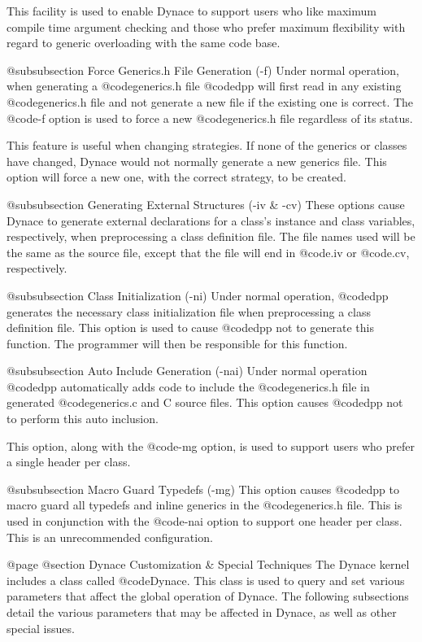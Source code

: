 This facility is used to enable Dynace to support users who like
maximum compile time argument checking and those who prefer maximum
flexibility with regard to generic overloading with the same code
base.

@subsubsection Force Generics.h File Generation (-f)
Under normal operation, when generating a @code{generics.h} file
@code{dpp} will first read in any existing @code{generics.h} file
and not generate a new file if the existing one is correct.  The
@code{-f} option is used to force a new @code{generics.h} file
regardless of its status.

This feature is useful when changing strategies.  If none of the generics
or classes have changed, Dynace would not normally generate a new generics
file.  This option will force a new one, with the correct strategy, to
be created.

@subsubsection Generating External Structures (-iv & -cv)
These options cause Dynace to generate external declarations for
a class's instance and class variables, respectively, when preprocessing
a class definition file.  The file names used will be the same as
the source file, except that the file will end in @code{.iv} or
@code{.cv}, respectively.

@subsubsection Class Initialization (-ni)
Under normal operation, @code{dpp} generates the necessary class
initialization file when preprocessing a class definition file.
This option is used to cause @code{dpp} not to generate this
function.  The programmer will then be responsible for this
function.

@subsubsection Auto Include Generation (-nai)
Under normal operation @code{dpp} automatically adds code to include the
@code{generics.h} file in generated @code{generics.c} and C source
files.  This option causes @code{dpp} not to perform this auto inclusion.

This option, along with the @code{-mg} option, is used to support
users who prefer a single header per class.

@subsubsection Macro Guard Typedefs (-mg)
This option causes @code{dpp} to macro guard all typedefs and inline
generics in the @code{generics.h} file.  This is used in conjunction
with the @code{-nai} option to support one header per class.  This is an
unrecommended configuration.


@page
@section Dynace Customization & Special Techniques
The Dynace kernel includes a class called @code{Dynace}.  This class is used
to query and set various parameters that affect the global operation
of Dynace.  The following subsections detail the various parameters that
may be affected in Dynace, as well as other special issues.


